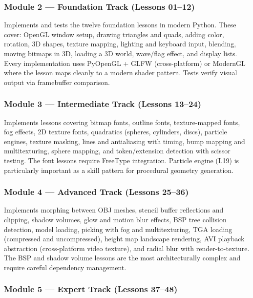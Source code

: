 \documentclass[11pt,letterpaper]{article}
\begin{document}
\subsubsection{Module 2 --- Foundation Track (Lessons 01--12)}

Implements and tests the twelve foundation lessons in modern Python. These cover: OpenGL window setup, drawing triangles and quads, adding color, rotation, 3D shapes, texture mapping, lighting and keyboard input, blending, moving bitmaps in 3D, loading a 3D world, wave/flag effect, and display lists. Every implementation uses PyOpenGL + GLFW (cross-platform) or ModernGL where the lesson maps cleanly to a modern shader pattern. Tests verify visual output via framebuffer comparison.

\subsubsection{Module 3 --- Intermediate Track (Lessons 13--24)}

Implements lessons covering bitmap fonts, outline fonts, texture-mapped fonts, fog effects, 2D texture fonts, quadratics (spheres, cylinders, discs), particle engines, texture masking, lines and antialiasing with timing, bump mapping and multitexturing, sphere mapping, and token/extension detection with scissor testing. The font lessons require FreeType integration. Particle engine (L19) is particularly important as a skill pattern for procedural geometry generation.

\subsubsection{Module 4 --- Advanced Track (Lessons 25--36)}

Implements morphing between OBJ meshes, stencil buffer reflections and clipping, shadow volumes, glow and motion blur effects, BSP tree collision detection, model loading, picking with fog and multitexturing, TGA loading (compressed and uncompressed), height map landscape rendering, AVI playback abstraction (cross-platform video texture), and radial blur with render-to-texture. The BSP and shadow volume lessons are the most architecturally complex and require careful dependency management.

\subsubsection{Module 5 --- Expert Track (Lessons 37--48)}
\end{document}
